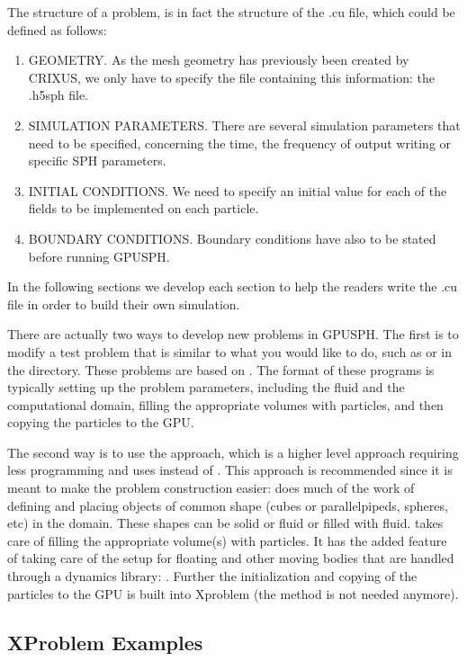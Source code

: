 The structure of a problem, is in fact the structure of the .cu file, 
which could be defined as follows:
\begin{enumerate}
\item GEOMETRY. As the mesh geometry has previously been 
created by CRIXUS, we only have to specify the file 
containing this information: the .h5sph file.
\item SIMULATION PARAMETERS. There are several simulation 
parameters that need to be specified, concerning the time, 
the frequency of output writing or specific SPH parameters.
\item INITIAL CONDITIONS. We need to specify an initial 
value for each of the fields to be implemented on each particle.
\item BOUNDARY CONDITIONS. Boundary conditions 
have also to be stated before running GPUSPH.
\end{enumerate}
In the following sections we develop each section to help 
the readers write the .cu file in order to build their own simulation.

There are actually two ways to develop new problems in GPUSPH.  
The first is to modify a test problem that is similar to what you would like to do, 
such as  or  in the  directory.  
These problems are based on .  
The format of these programs is typically setting up the problem parameters, 
including the fluid and the computational domain, 
filling the appropriate volumes with particles, 
and then copying the particles to the GPU.

The second way is to use the  approach, which is a higher 
level approach requiring less programming and uses  
instead of . This approach is recommended since it is meant to make 
the problem construction easier:
 does much of the work of defining and placing objects of common shape 
(cubes or parallelpipeds, spheres, etc)  in the domain.  
These shapes can be solid or fluid or filled with fluid.  
 takes care of filling the appropriate volume(s) with particles.   
It has the added feature of taking care of the setup for floating and other moving 
bodies that are handled through a dynamics library:  .  
Further the initialization and copying of the particles to the GPU is built into Xproblem 
(the  method is not needed anymore).  

\subsection{XProblem Examples}

